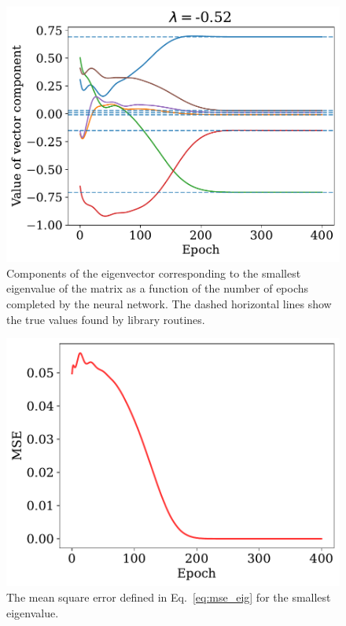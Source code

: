 \documentclass[a4paper, 
amsfonts, 
amssymb, 
amsmath, 
reprint, 
showkeys, 
nofootinbib, 
twoside]{revtex4-2}
\begin{document}
\begin{figure}
    \centering
    \includegraphics[width = \columnwidth]{Figures/NN_eigval_min.pdf}
    \caption{Components of the eigenvector corresponding to the smallest eigenvalue of the matrix as a function of the number of epochs completed by the neural network. The dashed horizontal lines show the true values found by library routines. }
    \label{fig:nn_eigval_min}
\end{figure}


\begin{figure}
    \centering
    \includegraphics[width = \columnwidth]{Figures/NN_eigval_MSE_min.pdf}
    \caption{ The mean square error defined in Eq.~\eqref{eq:mse_eig} for the smallest eigenvalue.   }
    \label{fig:nn_eigval_MSE_min}
\end{figure}
\end{document}
